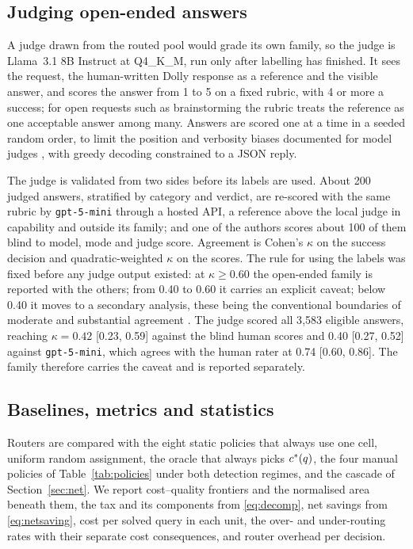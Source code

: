 \subsection{Judging open-ended answers}
\label{sec:setup-judge}

A judge drawn from the routed pool would grade its own family, so the judge
is Llama~3.1 8B Instruct \cite{grattafiori2024llama3} at Q4\_K\_M, run only
after labelling has finished. It sees the request, the human-written Dolly
response as a reference and the visible answer, and scores the answer from 1
to 5 on a fixed rubric, with 4 or more a success; for open requests such as
brainstorming the rubric treats the reference as one acceptable answer among
many. Answers are scored one at a time in a seeded random order, to limit the
position and verbosity biases documented for model judges
\cite{zheng2023judging}, with greedy decoding constrained to a JSON reply.

The judge is validated from two sides before its labels are used. About 200
judged answers, stratified by category and verdict, are re-scored with the
same rubric by \texttt{gpt-5-mini} through a hosted API, a reference above
the local judge in capability and outside its family; and one of the authors
scores about 100 of them blind to model, mode and judge score. Agreement is
Cohen's $\kappa$ \cite{cohen1960kappa} on the success decision and
quadratic-weighted $\kappa$ \cite{cohen1968weighted} on the scores. The rule
for using the labels was fixed before any judge output existed: at
$\kappa \geq 0.60$ the open-ended family is reported with the others; from
0.40 to 0.60 it carries an explicit caveat; below 0.40 it moves to a
secondary analysis, these being the conventional boundaries of moderate and
substantial agreement \cite{landis1977measurement}. The judge scored all
3{,}583 eligible answers, reaching $\kappa = 0.42$ [0.23, 0.59] against the
blind human scores and 0.40 [0.27, 0.52] against \texttt{gpt-5-mini}, which
agrees with the human rater at 0.74 [0.60, 0.86].
The family therefore carries the caveat and is reported separately.

\subsection{Baselines, metrics and statistics}
\label{sec:setup-stats}

Routers are compared with the eight static policies that always use one cell,
uniform random assignment, the oracle that always picks $c^{*}(q)$, the four
manual policies of Table~\ref{tab:policies} under both detection regimes, and
the cascade of Section~\ref{sec:net}. We report cost--quality frontiers and
the normalised area beneath them, the tax and its components from
\eqref{eq:decomp}, net savings from \eqref{eq:netsaving}, cost per solved
query in each unit, the over- and under-routing rates with their separate
cost consequences, and router overhead per decision.

